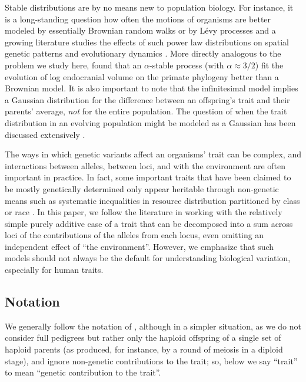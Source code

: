 \documentclass{article}
\newcommand{\1}{\mathbbm{1}}
\theoremstyle{remark}
\theoremstyle{definition}
\begin{document}
Stable distributions are by no means new to population biology.
For instance, it is a long-standing question how often the motions of organisms
are better modeled by essentially Brownian random walks or by L\'evy processes \citep{benhamou2007animals}
and a growing literature studies the effects of such power law distributions
on spatial genetic patterns and evolutionary dynamics
\citep[e.g.,][]{paulose2019spatial,smith2023isolation}.
More directly analogous to the problem we study here, \citet{landis2012phylogenetic}
found that an $\alpha$-stable process (with $\alpha \approx 3/2$) fit the evolution of log endocranial volume
on the primate phylogeny
better than a Brownian model.
It is also important to note that
the infinitesimal model implies a Gaussian distribution for the difference between an offspring's trait and their parents' average,
\emph{not} for the entire population.
The question of when the trait distribution in an evolving population
might be modeled as a Gaussian has been discussed extensively
\citep[e.g.,][]{turelli1994genetic,dbarre2015evolution}.

The ways in which genetic variants affect an organisms' trait can be complex,
and interactions between alleles, between loci, and with the environment are often important in practice.
In fact, some important traits that have been claimed to be mostly genetically determined 
only appear heritable through non-genetic means
such as systematic inequalities in resource distribution partitioned by class or race
\citep[e.g.,][]{davenport1916hereditary}.
In this paper, we follow the literature in working with the relatively simple purely additive case
of a trait that can be decomposed into a sum across loci of the contributions of the alleles from each locus,
even omitting an independent effect of ``the environment''.
However, we emphasize that such models should not always be the default for understanding biological variation,
especially for human traits.

\subsection*{Notation}

We generally follow the notation of \citet{barton2017infinitesimal},
although in a simpler situation,
as we do not consider full pedigrees
but rather only the haploid offspring of a single set of haploid parents
(as produced, for instance, by a round of meiosis in a diploid stage),
and ignore non-genetic contributions to the trait;
so, below we say ``trait'' to mean ``genetic contribution to the trait''.
\end{document}
